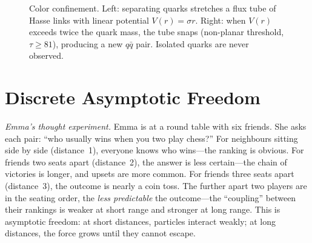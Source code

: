 \documentclass[11pt, a4paper, openany]{book}
\begin{document}
\begin{figure}[ht]
\centering
{}
\caption{Color confinement.  Left: separating quarks stretches a
flux tube of Hasse links with linear potential $V(r) = \sigma r$.
Right: when $V(r)$ exceeds twice the quark mass, the tube snaps
(non-planar threshold, $\tau \geq 81$), producing a new $q\bar{q}$
pair.  Isolated quarks are never observed.}
\label{fig:confinement}
\end{figure}

\section{Discrete Asymptotic Freedom}\label{sec:asymptotic-freedom}

\smallskip\noindent
\textit{Emma's thought experiment.}
Emma is at a round table with six friends. She asks each pair: ``who
usually wins when you two play chess?'' For neighbours sitting side by
side (distance~1), everyone knows who wins---the ranking is obvious.
For friends two seats apart (distance~2), the answer is less
certain---the chain of victories is longer, and upsets are more
common.  For friends three seats apart (distance~3), the outcome is
nearly a coin toss.  The further apart two players are in the seating
order, the \emph{less predictable} the outcome---the ``coupling''
between their rankings is weaker at short range and stronger at long
range.  This is asymptotic freedom: at short distances, particles
interact weakly; at long distances, the force grows until they
cannot escape.
\smallskip
\end{document}
